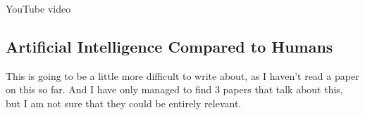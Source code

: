 YouTube video \cite{youtube:make-it-home}

\subsection{Artificial Intelligence Compared to Humans}
This is going to be a little more difficult to write about, as I haven't read a paper on this so far. And I have only managed to find 3 papers that talk about this, but I am not sure that they could be entirely relevant.